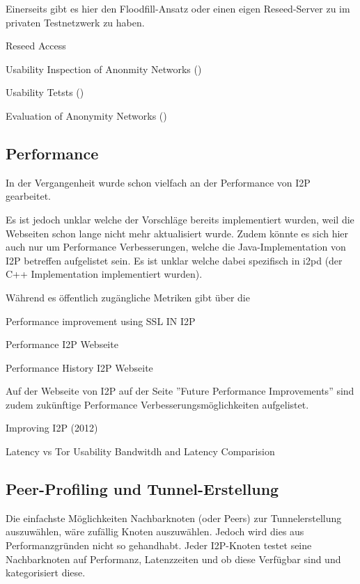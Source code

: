Einerseits gibt es hier den Floodfill-Ansatz oder einen eigen Reseed-Server zu im privaten Testnetzwerk zu haben.

Reseed Access
\cite{noauthor_i2p_nodate-7}

Usability Inspection of Anonmity Networks
(\cite{abou-tair_usability_2009})

Usability Tetsts
(\cite{schomburg_anonymity_2009})

Evaluation of Anonymity Networks
(\cite{timpanaro_evaluation_2015})

\subsection{Performance}

In der Vergangenheit wurde schon vielfach an der Performance von I2P gearbeitet.

Es ist jedoch unklar welche der Vorschläge bereits implementiert wurden, weil die Webseiten schon lange nicht mehr aktualisiert wurde.
Zudem könnte es sich hier auch nur um Performance Verbesserungen, welche die Java-Implementation von I2P betreffen aufgelistet sein.
Es ist unklar welche dabei spezifisch in i2pd (der C++ Implementation implementiert wurden).

Während es öffentlich zugängliche Metriken gibt über die 


Performance improvement using SSL IN I2P
\cite{vashi_performance_2015}

Performance I2P Webseite
\cite{noauthor_performance_nodate}

Performance History I2P Webseite
\cite{noauthor_performance_nodate-1}

Auf der Webseite von I2P auf der Seite ''Future Performance Improvements'' sind zudem zukünftige Performance Verbesserungsmöglichkeiten aufgelistet.
\cite{noauthor_future_nodate}

Improving I2P (2012)
\cite{timpanaro_improving_2012}

Latency vs Tor Usability Bandwitdh and Latency Comparision
\cite{ehlert_i2p_2021}


\subsection{Peer-Profiling und Tunnel-Erstellung}

Die einfachste Möglichkeiten Nachbarknoten (oder Peers) zur Tunnelerstellung auszuwählen, wäre zufällig Knoten auszuwählen. 
Jedoch wird dies aus Performanzgründen nicht so gehandhabt.
Jeder I2P-Knoten testet seine Nachbarknoten auf Performanz, Latenzzeiten und ob diese Verfügbar sind und kategorisiert diese.

